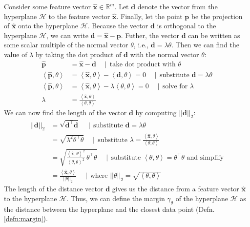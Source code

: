 \documentclass{article}[11pt]
\def\R{\mathbb{R}}
\newcommand{\norm}[1]{\left|\left|#1\right|\right|}
\begin{document}
Consider some feature vector $\hat{\mathbf{x}} \in \R^{m}$. Let $\mathbf{d}$ denote the vector from the hyperplane $\mathcal{H}$ to the feature vector $\hat{\mathbf{x}}$.
Finally, let the point $\mathbf{p}$ be the projection of $\hat{\mathbf{x}}$ onto the hyperplane $\mathcal{H}$.
Because the vector $\mathbf{d}$ is orthogonal to the hyperplane $\mathcal{H}$, we can write $\mathbf{d} = \hat{\mathbf{x}} - \mathbf{p}$.
Futher, the vector $\mathbf{d}$ can be written as some scalar multiple of the normal vector $\theta$, i.e., $\mathbf{d} = \lambda \theta$.
Then we can find the value of $\lambda$ by taking the dot product of $\mathbf{d}$ with the normal vector $\theta$:
\begin{align*}
    \hat{\mathbf{p}} & = \hat{\mathbf{x}} - \mathbf{d}\quad\mid\,\text{take dot product with $\theta$} \\
    \left<\hat{\mathbf{p}},\theta\right> & = \left<\hat{\mathbf{x}},\theta\right> - \left<\mathbf{d},\theta\right> = 0\quad\mid\,\text{substitute $\mathbf{d} = \lambda \theta$} \\
    \left<\hat{\mathbf{p}},\theta\right> & = \left<\hat{\mathbf{x}},\theta\right> - \lambda \left<\theta,\theta\right> = 0\quad\mid\,\text{solve for $\lambda$} \\
    \lambda & = \frac{\left<\hat{\mathbf{x}},\theta\right>}{\left<\theta,\theta\right>}
\end{align*}
We can now find the length of the vector $\mathbf{d}$ by computing $\norm{\mathbf{d}}_{2}$:
\begin{align*}
    \norm{\mathbf{d}}_{2} & = \sqrt{\mathbf{d}^{\top}\mathbf{d}}\quad\mid\,\text{substitute $\mathbf{d} = \lambda \theta$} \\
    & = \sqrt{\lambda^{2}\theta^{\top}\theta}\quad\mid\,\text{substitute $\lambda = \frac{\left<\hat{\mathbf{x}},\theta\right>}{\left<\theta,\theta\right>}$} \\
    & = \sqrt{\frac{\left<\hat{\mathbf{x}},\theta\right>^{2}}{\left<\theta,\theta\right>^{2}}\,\theta^{\top}\theta}\quad\mid\, \text{substitute $\left<\theta,\theta\right> = \theta^{\top}\theta$ and simplify} \\
    & = \frac{\left<\hat{\mathbf{x}},\theta\right>}{\norm{\theta}_{2}}\quad\mid\,\text{where $\norm{\theta}_{2} = \sqrt{\left<\theta,\theta\right>}$}
\end{align*}
The length of the distance vector $\mathbf{d}$ gives us the distance from a feature vector $\hat{\mathbf{x}}$ to the hyperplane $\mathcal{H}$.
Thus, we can define the margin $\gamma_{\theta}$ of the hyperplane $\mathcal{H}$ as the distance between the hyperplane and the closest data point (Defn. \ref{defn:margin}).
\end{document}
